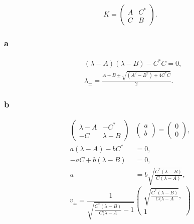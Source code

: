 \documentclass[a4paper,12pt,twoside]{article}
\begin{document}
\subsection{}%
\begin{equation}
	K = \begin{pmatrix}
		A & C^* \\
		C & B
	\end{pmatrix}.
\end{equation}
\subsubsection*{a}
\begin{align}
	& (\lambda - A)(\lambda-B)-C^*C = 0,\\
	& \lambda_\pm = \frac{A+B \pm \sqrt{(A^2-B^2)+4C^*C}}{2}.
\end{align}
\subsubsection*{b}
\begin{align}
	\begin{pmatrix}
		\lambda-A & -C^* \\
		-C & \lambda-B
	\end{pmatrix}
	& \begin{pmatrix}
		a \\ b
	\end{pmatrix}
	= \begin{pmatrix}
		0 \\ 0
	\end{pmatrix},\\
	a(\lambda-A) - bC^* &= 0,\\
	-aC+b(\lambda-B) &=0,\\
	a &= b \sqrt{\frac{C^*(\lambda-B)}{C(\lambda-A)}},
\end{align}
\begin{equation}
	v_\pm = \frac{1}{\sqrt{\frac{C^*(\lambda-B)}{C(\lambda-A}-1}}\begin{pmatrix}
		\sqrt{\frac{C^*(\lambda-B)}{C(\lambda-A}},\\
		1
	\end{pmatrix}
\end{equation}
\end{document}
